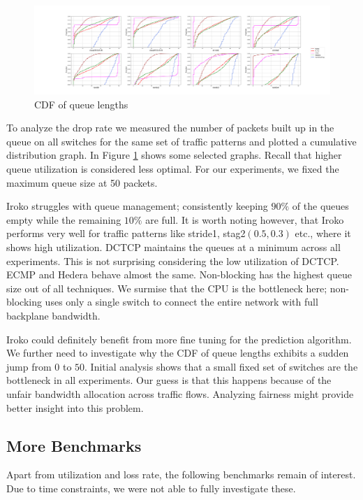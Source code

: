 \begin{figure}
	\centering
	\includegraphics[width=1\linewidth]{qlen.png}
	\caption{CDF of queue lengths}
	\label{fig:qlen}
\end{figure}

To analyze the drop rate we measured the number of packets built up in the queue
on all switches for the same set of traffic patterns and plotted a cumulative
distribution graph. In Figure \ref{fig:qlen} shows some selected
graphs. Recall that higher queue utilization is considered less optimal. For our experiments, we fixed the maximum
queue size at 50 packets.

Iroko struggles with queue management; consistently keeping $90\%$ of the queues
empty while the remaining $10\%$ are full. It is worth noting however, that Iroko performs
very well for traffic patterns like stride1, stag2$(0.5,0.3)$ etc., where it
shows high utilization. DCTCP maintains the queues at a minimum across
all experiments. This is not surprising considering the low utilization of
DCTCP. ECMP and Hedera behave almost the same. Non-blocking has the highest
queue size out of all techniques. We surmise that the CPU is the bottleneck here;
non-blocking uses only a single switch to connect the entire network with full
backplane bandwidth.

Iroko could definitely benefit from more fine tuning for the prediction algorithm. We further
need to investigate why the CDF of queue lengths exhibits a sudden jump from $0$ to $50$. Initial
analysis shows that a small fixed set of switches are the bottleneck in all
experiments. Our guess is that this happens because of the unfair bandwidth
allocation across traffic flows. Analyzing fairness might provide better insight
into this problem.

\subsection{More Benchmarks}

Apart from utilization and loss rate, the following benchmarks remain of interest.
Due to time constraints, we were not able to fully investigate these.

